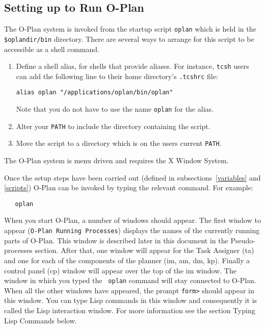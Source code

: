\subsection{\protect\label{scripts}Setting up to Run O-Plan}
The O-Plan system is invoked from the startup script {\tt oplan}
which is held in the {\tt {\sc \$oplandir}/bin} directory. There
are several ways to arrange for this script to be accessible as
a shell command.

\begin{enumerate}
\item Define a shell alias, for shells that provide aliases.
For instance, {\tt tcsh} users can add the following line to their
home directory's {\tt .tcshrc} file:

\begin{verbatim}
alias oplan "/applications/oplan/bin/oplan"
\end{verbatim}

Note that you do not have to use the name {\tt oplan} for the alias.

\item Alter your {\tt PATH} to include the directory containing the
script.
\item Move the script to a directory which is on the users current
{\tt PATH}.
\end{enumerate}

The O-Plan system is menu driven and requires the X Window System.

Once the setup steps have been carried out (defined in
subsections~\ref{variables} and \ref{scripts}) O-Plan can be invoked
by typing the relevant command.  For example:

\begin{verbatim}
   oplan
\end{verbatim}

When you start O-Plan, a number of windows should appear.  The first
window to appear ({\tt O-Plan Running Processes}) displays the names
of the currently running parts of O-Plan.  This window is described
later in this document in the Pseudo-processes section. After that,
one window will appear for the Task Assigner ({\sc ta}) and one for
each of the components of the planner ({\sc im}, {\sc am}, {\sc dm},
{\sc kp}). Finally a control panel ({\sc cp}) window will appear over
the top of the {\sc im} window. The window in which you typed the {\tt
oplan} command will stay connected to O-Plan. When all the other
windows have appeared, the prompt {\tt form>} should appear in this
window.  You can type Lisp commands in this window and consequently it
is called the Lisp interaction window.  For more information see the
section Typing Lisp Commands below.


